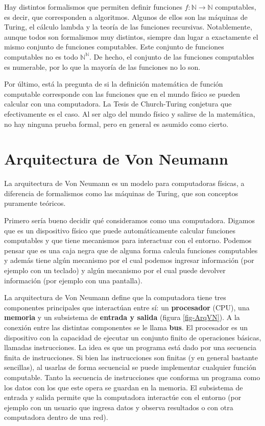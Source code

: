 \documentclass[a4paper, 12pt]{report}
\newcommand{\N}{\mathbb{N}}
\begin{document}
Hay distintos formalismos que permiten definir funciones $f:\N\to\N$ computables, es decir, que corresponden a algoritmos. Algunos de ellos son las máquinas de Turing, el cálculo lambda y la teoría de las funciones recursivas. Notablemente, aunque todos son formalismos muy distintos, siempre dan lugar a exactamente el mismo conjunto de funciones computables. Este conjunto de funciones computables no es todo $\N^\N$. De hecho, el conjunto de las funciones computables es numerable, por lo que la mayoría de las funciones no lo son.

Por último, está la pregunta de si la definición matemática de función computable corresponde con las funciones que en el mundo físico se pueden calcular con una computadora. La Tesis de Church-Turing conjetura que efectivamente es el caso. Al ser algo del mundo físico y salirse de la matemática, no hay ninguna prueba formal, pero en general es asumido como cierto.


\section{Arquitectura de Von Neumann}\label{sec-ArqVonNeu}

La arquitectura de Von Neumann es un modelo para computadoras físicas, a diferencia de formalismos como las máquinas de Turing, que son conceptos puramente teóricos.

Primero sería bueno decidir qué consideramos como una computadora. Digamos que es un dispositivo físico que puede automáticamente calcular funciones computables y que tiene mecanismos para interactuar con el entorno. Podemos pensar que es una caja negra que de alguna forma calcula funciones computables y además tiene algún mecanismo por el cual podemos ingresar información (por ejemplo con un teclado) y algún mecanismo por el cual puede devolver información (por ejemplo con una pantalla).

La arquitectura de Von Neumann define que la computadora tiene tres componentes principales que interactúan entre sí: un {\bf procesador }(CPU), una {\bf memoria} y un subsistema de {\bf entrada y salida} (figura \ref{fig-ArqVN}). A la conexión entre las distintas componentes se le llama {\bf bus}. El procesador es un dispositivo con la capacidad de ejecutar un conjunto finito de operaciones básicas, llamadas  instrucciones. La idea es que un programa está dado por una secuencia finita de instrucciones. Si bien las instrucciones son finitas (y en general bastante sencillas), al usarlas de forma secuencial se puede implementar cualquier función computable. Tanto la secuencia de instrucciones que conforma un programa como los datos con los que este opera se guardan en la memoria. El subsistema de entrada y salida permite que la computadora interactúe con el entorno (por ejemplo con un usuario que ingresa datos y observa resultados o con otra computadora dentro de una red).
\end{document}
